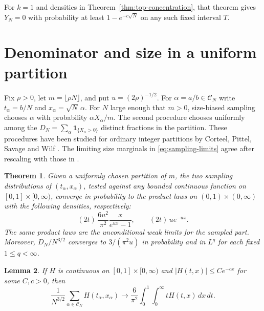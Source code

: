 \documentclass[11pt]{amsart}
\newtheorem{theorem}{Theorem}[section]
\newtheorem{lemma}[theorem]{Lemma}
\theoremstyle{remark}
\begin{document}
For \(k=1\) and densities in Theorem~\ref{thm:top-concentration}, that
theorem gives \(Y_N=0\) with probability at least \(1-e^{-c\sqrt N}\)
on any such fixed interval \(T\).

\section{Denominator and size in a uniform partition}\label{sec:sampling}

Fix \(\rho>0\), let \(m=\lfloor\rho N\rfloor\), and put \(u=(2\rho)^{-1/2}\).
For \(\alpha=a/b\in\mathcal C_N\) write \(t_\alpha=b/N\) and
\(x_\alpha=\sqrt N\,\alpha\). For \(N\) large enough that \(m>0\), size-biased
sampling chooses \(\alpha\) with probability \(\alpha X_\alpha/m\).
The second procedure chooses uniformly among the
\(D_N=\sum_\alpha\mathbf 1_{\{X_\alpha>0\}}\) distinct fractions in the partition.
These procedures have been studied for ordinary integer partitions by
Corteel, Pittel, Savage and Wilf \cite{corteel-et-al}. The limiting size
marginals in \eqref{eq:sampling-limits} agree after rescaling with those
in \cite[Theorems~2--3]{mutafchiev}.

\begin{theorem}\label{thm:sampling}
Given a uniformly chosen partition of \(m\), the two sampling
distributions of \((t_\alpha,x_\alpha)\), tested against any bounded continuous function
on \([0,1]\times[0,\infty)\),
converge in probability to the product laws on \((0,1)\times(0,\infty)\)
with the following densities, respectively:
\begin{equation}\label{eq:sampling-limits}
  (2t)\,\frac{6u^2}{\pi^2}\frac{x}{e^{ux}-1},
  \qquad
  (2t)\,u e^{-ux}.
\end{equation}
The same product laws are the unconditional weak limits for the
sampled part. Moreover, \(D_N/N^{3/2}\) converges to \(3/(\pi^2u)\) in probability and in \(L^q\) for each fixed \(1\le q<\infty\).
\end{theorem}

\begin{lemma}\label{lem:sampling-coprime}
If \(H\) is continuous on \([0,1]\times[0,\infty)\) and
\(|H(t,x)|\le C e^{-c x}\) for some \(C,c>0\), then
\begin{equation}\label{eq:sampling-coprime}
 \frac{1}{N^{3/2}}\sum_{\alpha\in\mathcal C_N}H(t_\alpha,x_\alpha)
 \longrightarrow
 \frac{6}{\pi^2}\int_0^1\int_0^\infty t H(t,x)\,dx\,dt.
\end{equation}
\end{lemma}
\end{document}
